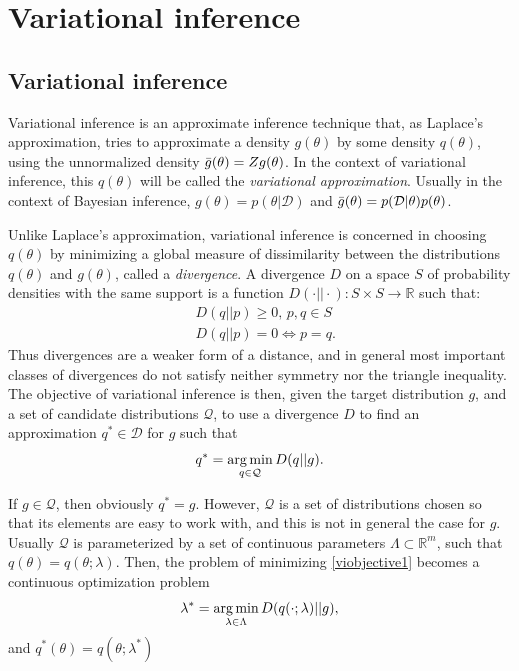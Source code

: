 \chapter{Variational inference}
\section{Variational inference}
Variational inference \cite{Bishop_2007,Blei_2017,Murphy_2012,Zhang_2019} is an approximate inference technique that, as Laplace's approximation, tries to approximate a density $g(\theta)$ by some density $q(\theta)$, using the unnormalized density ${\bar{g}}(\theta) = Z g(\theta)$. In the context of variational inference, this $q(\theta)$ will be called the \textit{variational approximation}. Usually in the context of Bayesian inference, $g(\theta) = p(\theta|\mathcal{D})$ and ${\bar{g}}(\theta) = p(\mathcal{D}|\theta)p(\theta)$.

Unlike Laplace's approximation, variational inference is concerned in choosing $q(\theta)$ by minimizing a global measure of dissimilarity between the distributions $q(\theta)$ and $g(\theta)$, called a \textit{divergence}. A divergence $D$ on a space $S$ of probability densities with the same support is a function $D(\cdot || \cdot) : S \times S \to \mathbb{R}$ such that:
\begin{equation}
\begin{split}
& D(q||p) \geq 0, \, p,q \in S \\
& D(q||p) = 0 \iff p = q.
\end{split}
\end{equation}
Thus divergences are a weaker form of a distance, and in general most important classes of divergences do not satisfy neither symmetry nor the triangle inequality. The objective of variational inference is then, given the target distribution $g$, and a set of candidate distributions $\mathcal{Q}$, to use a divergence $D$ to find an approximation $q^* \in \mathcal{D}$ for $g$ such that
\begin{equation}\label{viobjective1}
 q^* = \operatorname*{arg\,min}_{q \in \mathcal{Q}} D(q || g).
\end{equation}

If $g \in \mathcal{Q}$, then obviously $q^* = g$. However, $\mathcal{Q}$ is a set of distributions chosen so that its elements are easy to work with, and this is not in general the case for $g$. Usually $\mathcal{Q}$ is parameterized by a set of continuous parameters $\Lambda \subset \mathbb{R}^m$, such that $q(\theta) = q(\theta;\lambda)$. Then, the problem of minimizing \eqref{viobjective1} becomes a continuous optimization problem
\begin{equation}
 \lambda^* = \operatorname*{arg\,min}_{\lambda \in \Lambda} D(q(\cdot;\lambda)||g),
\end{equation}
and $q^*(\theta) = q(\theta;\lambda^*)$

